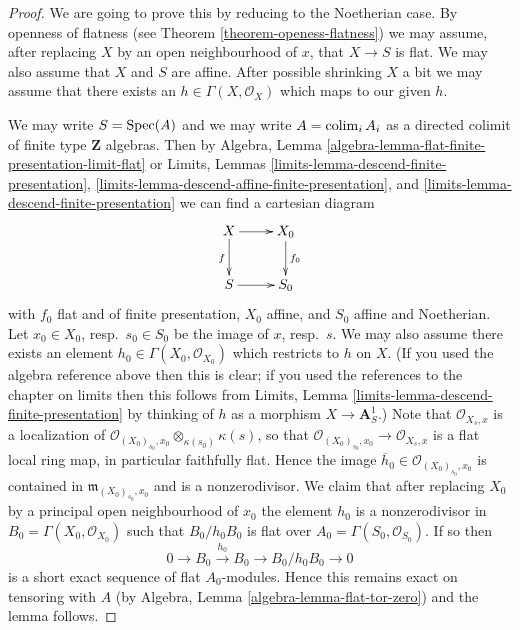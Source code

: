 \begin{proof}
We are going to prove this by reducing to the Noetherian case.
By openness of flatness (see
Theorem \ref{theorem-openess-flatness})
we may assume, after replacing $X$ by an
open neighbourhood of $x$, that $X \to S$ is flat.
We may also assume that $X$ and $S$ are affine.
After possible shrinking $X$ a bit we may assume that there exists
an $h \in \Gamma(X, \mathcal{O}_X)$ which maps to our given $h$.

\medskip\noindent
We may write $S = \mathop{\rm Spec}(A)$ and we may write $A = \mathop{\rm colim}\nolimits_i A_i$
as a directed colimit of finite type $\mathbf{Z}$ algebras.
Then by
Algebra, Lemma \ref{algebra-lemma-flat-finite-presentation-limit-flat}
or
Limits, Lemmas \ref{limits-lemma-descend-finite-presentation},
\ref{limits-lemma-descend-affine-finite-presentation}, and
\ref{limits-lemma-descend-finite-presentation}
we can find a cartesian diagram
$$
\xymatrix{
X \ar[r] \ar[d]_f & X_0 \ar[d]^{f_0} \\
S \ar[r] & S_0
}
$$
with $f_0$ flat and of finite presentation, $X_0$ affine, and
$S_0$ affine and Noetherian. Let $x_0 \in X_0$, resp.\ $s_0 \in S_0$
be the image of $x$, resp.\ $s$. We may also assume there exists an element
$h_0 \in \Gamma(X_0, \mathcal{O}_{X_0})$ which restricts to $h$ on $X$.
(If you used the algebra reference above then this is clear; if you used
the references to the chapter on limits then this follows from
Limits, Lemma \ref{limits-lemma-descend-finite-presentation}
by thinking of $h$ as a morphism $X \to \mathbf{A}^1_S$.)
Note that $\mathcal{O}_{X_s, x}$ is a localization of
$\mathcal{O}_{(X_0)_{s_0}, x_0} \otimes_{\kappa(s_0)} \kappa(s)$, so that
$\mathcal{O}_{(X_0)_{s_0}, x_0} \to \mathcal{O}_{X_s, x}$ is a flat
local ring map, in particular faithfully flat. Hence the image
$\overline{h}_0 \in \mathcal{O}_{(X_0)_{s_0}, x_0}$
is contained in $\mathfrak m_{(X_0)_{s_0}, x_0}$ and is a nonzerodivisor.
We claim that after replacing $X_0$ by a principal open neighbourhood of
$x_0$ the element $h_0$ is a nonzerodivisor in
$B_0 = \Gamma(X_0, \mathcal{O}_{X_0})$ such that $B_0/h_0B_0$ is flat
over $A_0 = \Gamma(S_0, \mathcal{O}_{S_0})$.
If so then
$$
0 \to B_0 \xrightarrow{h_0} B_0 \to B_0/h_0B_0 \to 0
$$
is a short exact sequence of flat $A_0$-modules. Hence this remains exact
on tensoring with $A$ (by
Algebra, Lemma \ref{algebra-lemma-flat-tor-zero})
and the lemma follows.


\end{proof}
